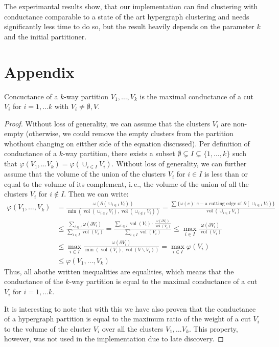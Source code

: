 \documentclass[acmsmall,nonacm,screen,review]{acmart}
\newcommand{\ie}{i.\,e.,\xspace}
\DeclareMathOperator{\vol}{vol}
\begin{document}
The experimantal results show, that our implementation can find clustering
with conductance comparable to a state of the art hypergraph clustering and
needs significantly less time to do so, but the result heavily depends on 
the parameter $k$ and the initial partitioner.

\appendix
\section{Appendix}
\label{appendix:a}

\begin{theorem}
  Concuctance of a $k$-way partition $V_1, \dots, V_k$ is the maximal conductance 
  of a cut $V_i$ for $i = 1, \dots k$ with $V_i \neq \emptyset, V$. 
\end{theorem}
\begin{proof}
Without loss of generality, we can assume that the clusters $V_i$ are
non-empty (otherwise, we could remove the empty clusters from the 
partition whothout changing on eitther side of the equation discussed).
Per definition of conductance of a $k$-way partition, there exists a 
subset 
$\emptyset \subsetneq I \subsetneq \{1, \dots, k\}$ such that 
$\varphi(V_1, \dots V_k) = \varphi(\cup_{i \in I} V_i)$. Without loss 
of generality, we can further assume that the volume of the union of 
the clusters $V_i$ for $i \in I$ is less than or equal to the volume 
of its complement, \ie the volume of the union of all the clusters 
$V_i$ for $i \notin I$. Then we can write:
\begin{align*}
\varphi(V_1, \dots, V_k) 
&= 
\frac{\omega(\partial (\cup_{i \in I} V_i))}
     {\min(\vol(\cup_{i \in I} V_i), \vol(\cup_{i \notin I} V_i))} 
=
\frac{\sum \{\omega(e) : e - \text{a cutting edge of } \partial(\cup_{i \in I} V_i)\}}
     {\vol(\cup_{i \in I} V_i)}
\\ & \leq
\frac{\sum_{i \in I} \omega(\partial V_i)}
     {\sum_{i \in I} \vol(V_i)} 
=
\frac{\sum_{i \in I} \vol(V_i) \cdot \frac{\omega(\partial V_i)}
                                          {\vol(V_i)}}
     {\sum_{i \in I} \vol(V_i)} 
\leq
\max_{i \in I}\frac{\omega(\partial V_i)}
                   {\vol(V_i)}
\\ &\leq
\max_{i \in I}\frac{\omega(\partial V_i)}
                   {\min(\vol(V_i), \vol(V \backslash V_i))}
=
\max_{i \in I} \varphi(V_i)
\\ &\leq 
\varphi(V_1, \dots, V_k)
\end{align*}
Thus, all abothe written inequalities are equalities, which means that 
the conductance of the $k$-way partition is equal to the maximal 
conductance of a cut $V_i$ for $i = 1, \dots k$.

It is interesting to note that with this we have also proven that the 
conductance of a hypergraph partition is equal to the maximum ratio of 
the weight of a cut $V_i$ to the volume of the cluster $V_i$ over all 
the clusters $V_1, \dots V_k$. This property, however, was not used 
in the implementation due to late discovery.
\end{proof}




\end{document}
